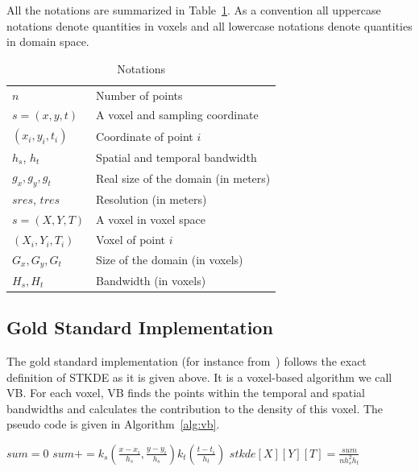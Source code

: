 \documentclass[10pt, conference, compsocconf]{IEEEtran}
\begin{document}
All the notations are summarized in Table~\ref{tab:notation}. As a
convention all uppercase notations denote quantities in voxels and all
lowercase notations denote quantities in domain space.

\begin{table}
  \centering
  \begin{tabular}{|l|l|}
    \hline 
    $n$ & Number of points\\
    $s = (x,y,t)$ & A voxel and sampling coordinate\\
    $(x_i, y_i, t_i)$ & Coordinate of point $i$\\
    $h_s$, $h_t$ & Spatial and temporal bandwidth \\ 
    $g_x, g_y, g_t$ & Real size of the domain (in meters) \\
    \hline
    $sres$, $tres$ & Resolution (in meters) \\
    $s = (X,Y,T)$ & A voxel in voxel space\\
    $(X_i, Y_i, T_i)$ & Voxel of point $i$\\
    $G_x, G_y, G_t$ & Size of the domain (in voxels)\\
    $H_s, H_t$ & Bandwidth (in voxels) \\
    \hline 
  \end{tabular}
  \caption{Notations}
  \label{tab:notation}
  \vspace*{-3em}
\end{table}



\subsection{Gold Standard Implementation}

The gold standard implementation (for instance from~\cite{Hohl16}) follows the exact definition of STKDE
as it is given above. It is a voxel-based algorithm we call VB. For
each voxel, VB finds the points within the temporal and spatial bandwidths and calculates the contribution
to the density of this voxel. The pseudo code is given in Algorithm~\ref{alg:vb}.

\begin{algorithm}
\caption{\textsc{VB}}
\scriptsize
\begin{algorithmic}
\State $sum = 0$
    \State $sum += k_s(\frac{x-x_i}{h_s},\frac{y-y_i}{h_s}) k_t(\frac{t-t_i}{h_t})$
    \EndIf
  \EndFor
  \State $stkde[X][Y][T] = \frac{sum}{n h_s^2h_t}$
\EndFor
\end{algorithmic}
\label{alg:vb}
\end{algorithm}
\end{document}
